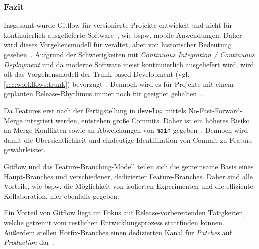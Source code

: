 \subsubsection{Fazit}

Insgesamt wurde Gitflow für versionierte Projekte entwickelt und nicht für kontinuierlich ausgelieferte Software~\cite{driessenSuccessfulGitBranching2010}, wie bspw. mobile Anwendungen. Daher wird dieses Vorgehensmodell für veraltet, aber von historischer Bedeutung gesehen~\cite{atlassianGitflowWorkflow}. Aufgrund der Schwierigkeiten mit \emph{Continuous Integration / Continuous Deployment} und da moderne Software meist kontinuierlich ausgeliefert wird, wird oft das Vorgehensmodell der Trunk-based Development (vgl. \autoref{sec:workflows:trunk}) bevorzugt~\cite{atlassianGitflowWorkflow}. Dennoch wird es für Projekte mit einem geplanten Release-Rhythmus immer noch für geeignet gehalten~\cite{atlassianGitflowWorkflow,driessenSuccessfulGitBranching2010}.

Da Features erst nach der Fertigstellung in \texttt{develop} mittels No\hyp Fast\hyp Forward\hyp Merge integriert werden, entstehen große Commits. Daher ist ein höheres Risiko an Merge\hyp Konflikten sowie an Abweichungen von \texttt{main} gegeben~\cite{atlassianGitflowWorkflow}. Dennoch wird damit die Übersichtlichkeit und eindeutige Identifikation von Commit zu Feature gewährleistet.

Gitflow und das Feature\hyp Branching\hyp Modell teilen sich die gemeinsame Basis eines Haupt\hyp Branches und verschiedener, dedizierter Feature\hyp Branches. Daher sind alle Vorteile, wie bspw. die Möglichkeit von isolierten Experimenten und die effiziente Kollaboration, hier ebenfalls gegeben.

Ein Vorteil von Gitflow liegt im Fokus auf Release\hyp vorbereitenden Tätigkeiten, welche getrennt vom restlichen Entwicklungsprozess stattfinden können. Außerdem stellen Hotfix\hyp Branches einen dedizierten Kanal für \emph{Patches} auf \emph{Production} dar~\cite{atlassianGitflowWorkflow}.
